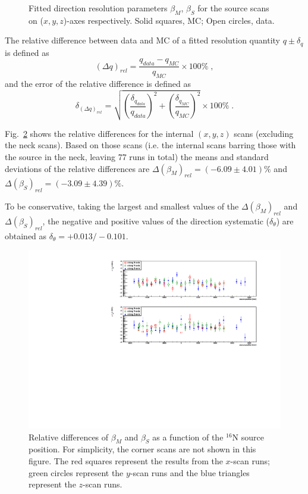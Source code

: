 \begin{figure}
	\caption[Fitted direction resolution parameters $\beta_M$, $\beta_S$ for the source scans.]{Fitted direction resolution parameters $\beta_M$, $\beta_S$ for the source scans on ($x, y, z$)-axes respectively. Solid squares, MC; Open circles, data.\label{angularResolScan}}
\end{figure}

The relative difference between data and MC of a fitted resolution quantity $q\pm \delta_q$ is defined as
\begin{equation}
(\Delta q)_{rel} = \frac{q_{data}-q_{MC}}{q_{MC}}\times 100\%\;,
\end{equation}
and the error of the relative difference is defined as 
\begin{equation}
\delta_{(\Delta q)_{rel}} = \sqrt{(\frac{\delta_{q_{data}}}{q_{data}})^2+(\frac{\delta_{q_{MC}}}{q_{MC}})^2}\times 100\% \; .
\end{equation}\label{eq:erors_relativeBiases}

Fig.~\ref{relative_biasesVsPositions} shows the relative differences for the internal $(x, y, z)$ scans (excluding the neck scans). Based on those scans (i.e. the internal scans barring those with the source in the neck, leaving 77 runs in total) the means and standard deviations of the relative differences are $\Delta(\beta_M)_{rel}=(-6.09\pm4.01)\%$ and $\Delta(\beta_S)_{rel}=(-3.09\pm4.39)\%$.

To be conservative, taking the largest and smallest values of the $\Delta(\beta_M)_{rel}$ and $\Delta(\beta_S)_{rel}$, the negative and positive values of the direction systematic ($\delta_\theta$) are obtained as $\delta_\theta=+0.013/-0.101$.

\begin{figure}[!htb]
	\centering
	\includegraphics[width=16cm]{angularResol_scanXYZ.pdf}
	\caption[Relative differences of $\beta_M$ and $\beta_S$ as a function of the $^{16}$N source position.]{Relative differences of $\beta_M$ and $\beta_S$ as a function of the $^{16}$N source position. For simplicity, the corner scans are not shown in this figure. The red squares represent the results from the $x$-scan runs; green circles represent the $y$-scan runs and the blue triangles represent the $z$-scan runs. \label{relative_biasesVsPositions}}
\end{figure}

